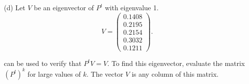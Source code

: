 \documentclass{ximera}
\begin{document}
\begin{exercise}
\begin{solution}
(d) \ans Let $V$ be an eigenvector of $P^t$ with eigenvalue 1.
\[
V = \left(\begin{array}{r} 0.1408 \\ 0.2195 \\ 0.2154 \\ 0.3032
\\ 0.1211 \end{array}\right).
\]

\soln \Matlab can be used to verify that $P^tV = V$.  To find this
eigenvector, evaluate the matrix $(P^t)^k$ for large values of $k$.
The vector $V$ is any column of this matrix.

\end{solution}
\end{exercise}
\end{document}
